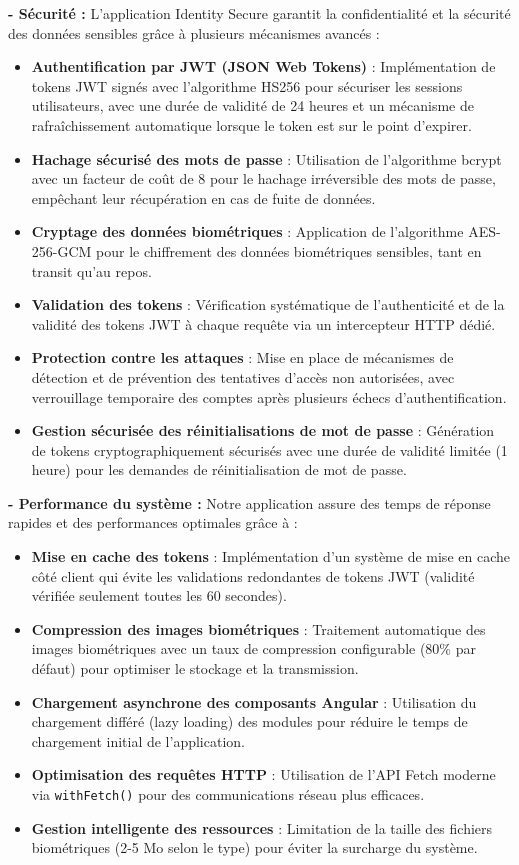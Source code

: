 \textbf{-  Sécurité :} L'application Identity Secure garantit la confidentialité et la sécurité des données sensibles grâce à plusieurs mécanismes avancés :
\begin{itemize}[label=$\circ$]
  \item \textbf{Authentification par JWT (JSON Web Tokens)} : Implémentation de tokens JWT signés avec l'algorithme HS256 pour sécuriser les sessions utilisateurs, avec une durée de validité de 24 heures et un mécanisme de rafraîchissement automatique lorsque le token est sur le point d'expirer.
  \item \textbf{Hachage sécurisé des mots de passe} : Utilisation de l'algorithme bcrypt avec un facteur de coût de 8 pour le hachage irréversible des mots de passe, empêchant leur récupération en cas de fuite de données.
  \item \textbf{Cryptage des données biométriques} : Application de l'algorithme AES-256-GCM pour le chiffrement des données biométriques sensibles, tant en transit qu'au repos.
  \item \textbf{Validation des tokens} : Vérification systématique de l'authenticité et de la validité des tokens JWT à chaque requête via un intercepteur HTTP dédié.
  \item \textbf{Protection contre les attaques} : Mise en place de mécanismes de détection et de prévention des tentatives d'accès non autorisées, avec verrouillage temporaire des comptes après plusieurs échecs d'authentification.
  \item \textbf{Gestion sécurisée des réinitialisations de mot de passe} : Génération de tokens cryptographiquement sécurisés avec une durée de validité limitée (1 heure) pour les demandes de réinitialisation de mot de passe.
\end{itemize}

\textbf{- Performance du système :} Notre application assure des temps de réponse rapides et des performances optimales grâce à :
\begin{itemize}[label=$\circ$]
  \item \textbf{Mise en cache des tokens} : Implémentation d'un système de mise en cache côté client qui évite les validations redondantes de tokens JWT (validité vérifiée seulement toutes les 60 secondes).
  \item \textbf{Compression des images biométriques} : Traitement automatique des images biométriques avec un taux de compression configurable (80\% par défaut) pour optimiser le stockage et la transmission.
  \item \textbf{Chargement asynchrone des composants Angular} : Utilisation du chargement différé (lazy loading) des modules pour réduire le temps de chargement initial de l'application.
  \item \textbf{Optimisation des requêtes HTTP} : Utilisation de l'API Fetch moderne via \texttt{withFetch()} pour des communications réseau plus efficaces.
  \item \textbf{Gestion intelligente des ressources} : Limitation de la taille des fichiers biométriques (2-5 Mo selon le type) pour éviter la surcharge du système.
\end{itemize}


